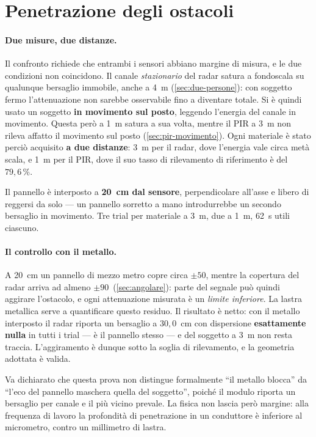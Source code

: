 \section{Penetrazione degli ostacoli}
\label{sec:ostacoli}

\paragraph{Due misure, due distanze.} Il confronto richiede che entrambi i sensori
abbiano margine di misura, e le due condizioni non coincidono. Il canale
\emph{stazionario} del radar satura a fondoscala su qualunque bersaglio immobile,
anche a 4~m (\cref{sec:due-persone}): con soggetto fermo l'attenuazione non sarebbe
osservabile fino a diventare totale. Si è quindi usato un soggetto \textbf{in
movimento sul posto}, leggendo l'energia del canale in movimento. Questa però a 1~m
satura a sua volta, mentre il PIR a 3~m non rileva affatto il movimento sul posto
(\cref{sec:pir-movimento}). Ogni materiale è stato perciò acquisito \textbf{a due
distanze}: 3~m per il radar, dove l'energia vale circa metà scala, e 1~m per il PIR,
dove il suo tasso di rilevamento di riferimento è del $79{,}6\,\%$.

Il pannello è interposto a \textbf{20~cm dal sensore}, perpendicolare all'asse e
libero di reggersi da solo --- un pannello sorretto a mano introdurrebbe un secondo
bersaglio in movimento. Tre trial per materiale a 3~m, due a 1~m, 62~s utili
ciascuno.

\paragraph{Il controllo con il metallo.} A 20~cm un pannello di mezzo metro copre
circa $\pm 50$\textdegree, mentre la copertura del radar arriva ad almeno
$\pm 90$\textdegree\ (\cref{sec:angolare}): parte del segnale può quindi aggirare
l'ostacolo, e ogni attenuazione misurata è un \emph{limite inferiore}. La lastra
metallica serve a quantificare questo residuo. Il risultato è netto: con il metallo
interposto il radar riporta un bersaglio a $30{,}0$~cm con dispersione
\textbf{esattamente nulla} in tutti i trial --- è il pannello stesso --- e del
soggetto a 3~m non resta traccia. L'aggiramento è dunque sotto la soglia di
rilevamento, e la geometria adottata è valida.

Va dichiarato che questa prova non distingue formalmente ``il metallo blocca'' da
``l'eco del pannello maschera quella del soggetto'', poiché il modulo riporta un
bersaglio per canale e il più vicino prevale. La fisica non lascia però margine:
alla frequenza di lavoro la profondità di penetrazione in un conduttore è inferiore
al micrometro, contro un millimetro di lastra.


